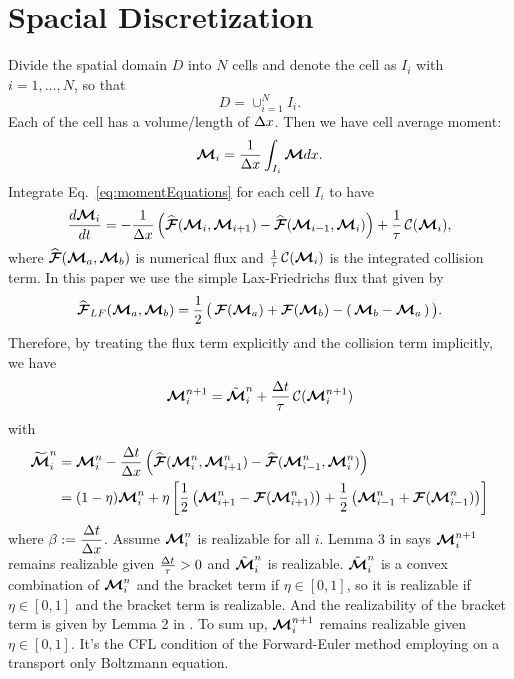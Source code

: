 \section{Spacial Discretization}\label{se:SpacialDiscretization}

Divide the spatial domain $D$ into $N$ cells and denote the cell as $I_{i}$ with $i = 1,\ldots,N$, so that
\begin{equation*}
D = \cup_{i = 1}^{N} I_{i}.
\end{equation*}
Each of the cell has a volume/length of $\Delta x$.
Then we have cell average moment:
\begin{equation}
\boldsymbol{\mathcal{M}}_{i} = \dfrac{1}{\Delta x} \int_{I_i}\boldsymbol{\mathcal{M}} dx.
\end{equation}
Integrate Eq.~\eqref{eq:momentEquations} for each cell $I_{i}$ to have
\begin{equation}
\dfrac{d \boldsymbol{\mathcal{M}}_{i}}{d t} = - \dfrac{1}{\Delta x} \left( \widehat{\boldsymbol{\mathcal{F}}}(\boldsymbol{\mathcal{M}}_{i},\boldsymbol{\mathcal{M}}_{i+1}) -  \widehat{\boldsymbol{\mathcal{F}}}(\boldsymbol{\mathcal{M}}_{i-1},\boldsymbol{\mathcal{M}}_{i})\right) + \frac{1}{\tau}\,\mathcal{C}(\boldsymbol{\mathcal{M}}_{i}),
\end{equation}
where $\widehat{\boldsymbol{\mathcal{F}}}(\boldsymbol{\mathcal{M}}_{a},\boldsymbol{\mathcal{M}}_{b})$ is numerical flux and $\frac{1}{\tau}\,\mathcal{C}(\boldsymbol{\mathcal{M}}_{i})$ is the integrated collision term.
In this paper we use the simple Lax-Friedrichs flux that given by
\begin{equation}
  \widehat{\boldsymbol{\mathcal{F}}}_{LF}(\boldsymbol{\mathcal{M}}_{a},\boldsymbol{\mathcal{M}}_{b})
  =\frac{1}{2}\,\big(\,\boldsymbol{\mathcal{F}}(\boldsymbol{\mathcal{M}}_{a})+\boldsymbol{\mathcal{F}}(\boldsymbol{\mathcal{M}}_{b})-(\,\boldsymbol{\mathcal{M}}_{b}-\boldsymbol{\mathcal{M}}_{a}\,)\,\big).
\end{equation}
Therefore, by treating the flux term explicitly and the collision term implicitly, we have
\begin{align*}
\boldsymbol{\mathcal{M}}_{i}^{n+1} = \tilde{\boldsymbol{\mathcal{M}}}^{n}_{i} + \frac{\Delta t}{\tau}\,\mathcal{C}(\boldsymbol{\mathcal{M}}^{n+1}_{i})
\end{align*}
with
\begin{align*}
\widetilde{\boldsymbol{\mathcal{M}}}^{n}_{i} 
& = \boldsymbol{\mathcal{M}}_{i}^{n} - \dfrac{\Delta t}{\Delta x} \left( \widehat{\boldsymbol{\mathcal{F}}}(\boldsymbol{\mathcal{M}}^{n}_{i},\boldsymbol{\mathcal{M}}^{n}_{i+1}) -  \widehat{\boldsymbol{\mathcal{F}}}(\boldsymbol{\mathcal{M}}^{n}_{i-1},\boldsymbol{\mathcal{M}}^{n}_{i})\right)\nonumber \\
& = (1-\eta)\boldsymbol{\mathcal{M}}_{i}^{n} + \eta\left[ \frac{1}{2}\left( \boldsymbol{\mathcal{M}}^{n}_{i+1}-\boldsymbol{\mathcal{F}}(\boldsymbol{\mathcal{M}}^{n}_{i+1})\right)  + \frac{1}{2}\left( \boldsymbol{\mathcal{M}}^{n}_{i-1}+\boldsymbol{\mathcal{F}}(\boldsymbol{\mathcal{M}}^{n}_{i-1})\right)\right]
\end{align*}
where $\beta := \dfrac{\Delta t}{\Delta x}$.
Assume $\boldsymbol{\mathcal{M}}_{i}^{n}$ is realizable for all $i$. 
Lemma 3 in \cite{chu_2018} says $\boldsymbol{\mathcal{M}}^{n+1}_{i}$ remains realizable given $\frac{\Delta t}{\tau} > 0$ and $\tilde{\boldsymbol{\mathcal{M}}}^{n}_{i}$ is realizable.
$\tilde{\boldsymbol{\mathcal{M}}}^{n}_{i}$ is a convex combination of $\boldsymbol{\mathcal{M}}_{i}^{n}$ and the bracket term if $\eta \in [0,1]$, so it is realizable if $\eta \in [0,1]$ and the bracket term is realizable.
And the realizability of the bracket term is given by Lemma 2 in \cite{chu_2018}.
To sum up, $\boldsymbol{\mathcal{M}}^{n+1}_{i}$ remains realizable given $\eta \in [0,1]$.
It's the CFL condition of the Forward-Euler method employing on a transport only Boltzmann equation.
